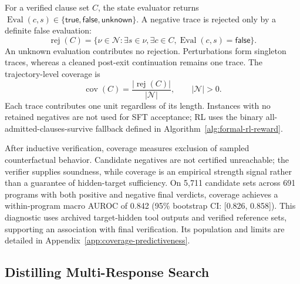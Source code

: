 For a verified clause set \(C\), the state evaluator returns
\(\operatorname{Eval}(c,s)\in\{\mathsf{true},\mathsf{false},\mathsf{unknown}\}\).
A negative trace is rejected only by a definite false evaluation:
\begin{equation}
 \operatorname{rej}(C)=\{\nu\in\mathcal N:\exists s\in\nu,\exists c\in C,
   \operatorname{Eval}(c,s)=\mathsf{false}\}.
 \label{eq:main-negative-rejection}
\end{equation}
An unknown evaluation contributes no rejection.  Perturbations form
singleton traces, whereas a cleaned post-exit continuation remains one trace.
The trajectory-level coverage is
\begin{equation}
  \operatorname{cov}(C)=
  \frac{|\operatorname{rej}(C)|}{|\mathcal N|},
  \qquad |\mathcal N|>0.
  \label{eq:method-coverage}
\end{equation}
Each trace contributes one unit regardless of its length.  Instances with no
retained negatives are not used for SFT acceptance; RL uses the binary
all-admitted-clauses-survive fallback defined in
Algorithm~\ref{alg:formal-rl-reward}.

After inductive verification, coverage measures exclusion of sampled
counterfactual behavior.  Candidate negatives are not certified unreachable;
the verifier supplies soundness, while coverage is an empirical strength
signal rather than a guarantee of hidden-target sufficiency.
On 5,711 candidate sets across 691 programs with both positive and negative
final verdicts, coverage achieves a within-program macro AUROC of 0.842
(95\% bootstrap CI: [0.826, 0.858]).  This diagnostic uses archived
target-hidden tool outputs and verified reference sets, supporting an
association with final verification.  Its population and limits are detailed
in Appendix~\ref{app:coverage-predictiveness}.

\subsection{Distilling Multi-Response Search}
\label{sec:method:sft}

